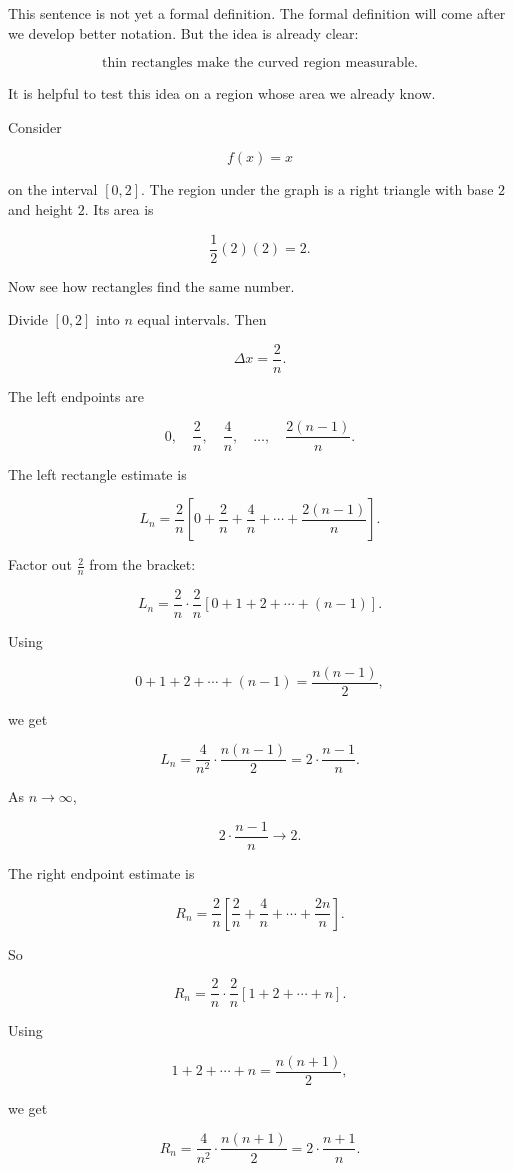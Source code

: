 This sentence is not yet a formal definition.  The formal definition will come after we
develop better notation.  But the idea is already clear:

\[
\text{thin rectangles make the curved region measurable.}
\]

It is helpful to test this idea on a region whose area we already know.

Consider

\[
f(x)=x
\]

on the interval \([0,2]\).  The region under the graph is a right triangle with base
\(2\) and height \(2\).  Its area is

\[
\frac12(2)(2)=2.
\]

Now see how rectangles find the same number.

Divide \([0,2]\) into \(n\) equal intervals.  Then

\[
\Delta x=\frac{2}{n}.
\]

The left endpoints are

\[
0,\quad \frac{2}{n},\quad \frac{4}{n},\quad \ldots,\quad \frac{2(n-1)}{n}.
\]

The left rectangle estimate is

\[
L_n
=
\frac{2}{n}
\left[
0+\frac{2}{n}+\frac{4}{n}+\cdots+\frac{2(n-1)}{n}
\right].
\]

Factor out \(\frac{2}{n}\) from the bracket:

\[
L_n
=
\frac{2}{n}\cdot \frac{2}{n}
\left[
0+1+2+\cdots+(n-1)
\right].
\]

Using

\[
0+1+2+\cdots+(n-1)=\frac{n(n-1)}{2},
\]

we get

\[
L_n
=
\frac{4}{n^2}\cdot \frac{n(n-1)}{2}
=
2\cdot\frac{n-1}{n}.
\]

As \(n\to\infty\),

\[
2\cdot\frac{n-1}{n}\to2.
\]

The right endpoint estimate is

\[
R_n
=
\frac{2}{n}
\left[
\frac{2}{n}+\frac{4}{n}+\cdots+\frac{2n}{n}
\right].
\]

So

\[
R_n
=
\frac{2}{n}\cdot \frac{2}{n}
\left[
1+2+\cdots+n
\right].
\]

Using

\[
1+2+\cdots+n=\frac{n(n+1)}{2},
\]

we get

\[
R_n
=
\frac{4}{n^2}\cdot \frac{n(n+1)}{2}
=
2\cdot\frac{n+1}{n}.
\]

